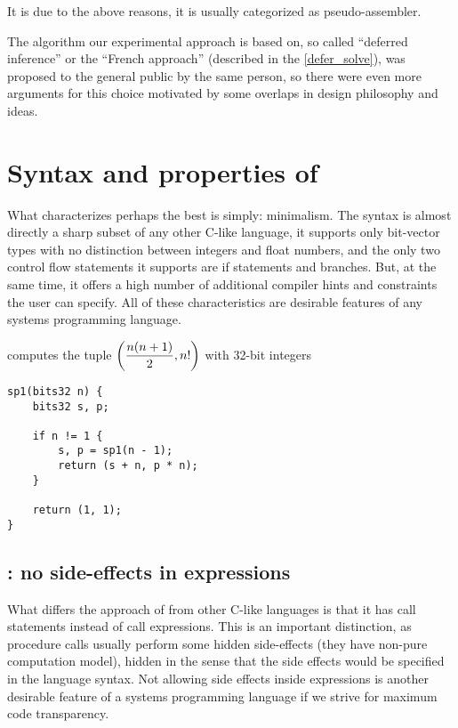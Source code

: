 It is due to the above reasons, it is usually categorized as pseudo-assembler.

The algorithm our experimental approach is based on, so called ``deferred inference'' or the ``French approach'' (described in the \cref{defer_solve}), was proposed to the general public by the same person, so there were even more arguments for this choice motivated by some overlaps in design philosophy and ideas.

\section{Syntax and properties of \cmm{}}

What characterizes \cmm{} perhaps the best is simply: minimalism. The syntax is almost directly a sharp subset of any other C-like language, it supports only bit-vector types with no distinction between integers and float numbers, and the only two control flow statements it supports are if statements and branches. But, at the same time, it offers a high number of additional compiler hints and constraints the user can specify. All of these characteristics are desirable features of any systems programming language.

\begin{ex}
     computes the tuple $\left(\dfrac{n(n+1)}{2}, n!\right)$ with 32-bit integers
    \begin{lstlisting}
sp1(bits32 n) {
    bits32 s, p;

    if n != 1 {
        s, p = sp1(n - 1);
        return (s + n, p * n);
    }

    return (1, 1);
}
    \end{lstlisting}
\end{ex}

\subsection{\cmm{}: no side-effects in expressions}

What differs the approach of \cmm{} from other C-like languages is that it has call statements instead of call expressions. This is an important distinction, as procedure calls usually perform some hidden side-effects (they have non-pure computation model), hidden in the sense that the side effects would be specified in the language syntax. Not allowing side effects inside expressions is another desirable feature of a systems programming language if we strive for maximum code transparency.

